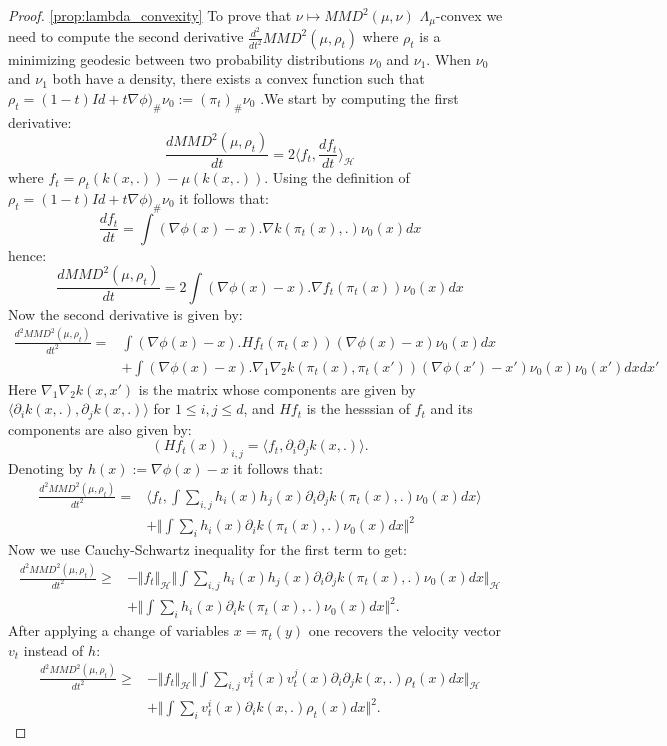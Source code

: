 \begin{proof} \ref{prop:lambda_convexity}
To prove that $\nu\mapsto MMD^{2}(\mu,\nu)$ $\Lambda_{\mu}$-convex
we need to compute the second derivative $\frac{d^{2}}{dt^{2}}MMD^{2}(\mu,\rho_{t})$
where $\rho_{t}$ is a minimizing geodesic between two probability
distributions $\nu_{0}$ and $\nu_{1}$. When $\nu_{0}$ and $\nu_{1}$
both have a density, there exists a convex function such that $\rho_{t}=(1-t)Id+t\nabla\phi)_{\#}\nu_{0}:=(\pi_{t})_{\#}\nu_{0}$
.We start by computing the first derivative:
\[
\frac{dMMD^{2}(\mu,\rho_{t})}{dt}=2\langle f_{t},\frac{df_{t}}{dt}\rangle_{\mathcal{H}}
\]
where $f_{t}=\rho_{t}(k(x,.))-\mu(k(x,.))$. Using the definition
of $\rho_{t}=(1-t)Id+t\nabla\phi)_{\#}\nu_0$ it follows that:
\[
\frac{df_{t}}{dt}=\int(\nabla\phi(x)-x).\nabla k(\pi_{t}(x),.)\nu_{0}(x)dx
\]
hence:
\[
\frac{dMMD^{2}(\mu,\rho_{t})}{dt}=2\int(\nabla\phi(x)-x).\nabla f_{t}(\pi_{t}(x))\nu_{0}(x)dx
\]
Now the second derivative is given by:
\begin{align*}
\frac{d^{2}MMD^{2}(\mu,\rho_{t})}{dt^{2}}= & \int(\nabla\phi(x)-x).Hf_{t}(\pi_{t}(x))(\nabla\phi(x)-x)\nu_{0}(x)dx\\
 & +\int(\nabla\phi(x)-x).\nabla_{1}\nabla_{2}k(\pi_{t}(x),\pi_{t}(x'))(\nabla\phi(x')-x')\nu_{0}(x)\nu_{0}(x')dxdx'
\end{align*}
Here $\nabla_{1}\nabla_{2}k(x,x')$ is the matrix whose components
are given by $\langle\partial_{i}k(x,.),\partial_{j}k(x,.)\rangle$
for $1\leq i,j\leq d$, and $Hf_{t}$ is the hesssian of $f_{t}$
and its components are also given by:
\[
(Hf_{t}(x))_{i,j}=\langle f_{t},\partial_{i}\partial_{j}k(x,.)\rangle.
\]
Denoting by $h(x):=\nabla\phi(x)-x$ it follows that:
\begin{align*}
\frac{d^{2}MMD^{2}(\mu,\rho_{t})}{dt^{2}}= & \langle f_{t},\int\sum_{i,j}h_{i}(x)h_{j}(x)\partial_{i}\partial_{j}k(\pi_{t}(x),.)\nu_{0}(x)dx\rangle\\
 & +\Vert\int\sum_{i}h_{i}(x)\partial_{i}k(\pi_{t}(x),.)\nu_{0}(x)dx\Vert^{2}
\end{align*}
Now we use Cauchy-Schwartz inequality for the first term to get:
\begin{align*}
\frac{d^{2}MMD^{2}(\mu,\rho_{t})}{dt^{2}}\geq & -\Vert f_{t}\Vert_{\mathcal{H}}\Vert\int\sum_{i,j}h_{i}(x)h_{j}(x)\partial_{i}\partial_{j}k(\pi_{t}(x),.)\nu_{0}(x)dx\Vert_{\mathcal{H}}\\
 & +\Vert\int\sum_{i}h_{i}(x)\partial_{i}k(\pi_{t}(x),.)\nu_{0}(x)dx\Vert^{2}.
\end{align*}
After applying a change of variables $x=\pi_{t}(y)$ one recovers the
velocity vector $v_{t}$ instead of $h$: 
\begin{align*}
\frac{d^{2}MMD^{2}(\mu,\rho_{t})}{dt^{2}}\geq & -\Vert f_{t}\Vert_{\mathcal{H}}\Vert\int\sum_{i,j}v_{t}^{i}(x)v_{t}^{j}(x)\partial_{i}\partial_{j}k(x,.)\rho_{t}(x)dx\Vert_{\mathcal{H}}\\
 & +\Vert\int\sum_{i}v_{t}^{i}(x)\partial_{i}k(x,.)\rho_{t}(x)dx\Vert^{2}.
\end{align*}


\end{proof}
